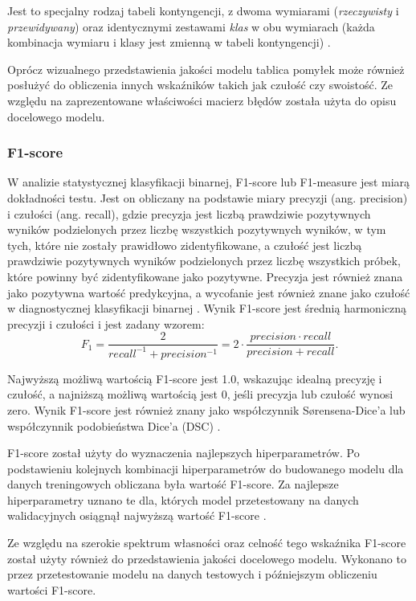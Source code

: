 \documentclass[polish, twoside, 12pt, a4paper]{article}
\theoremstyle{definition}
\theoremstyle{plain}
\theoremstyle{remark}
\begin{document}
Jest to specjalny rodzaj tabeli kontyngencji, z dwoma wymiarami (\emph{rzeczywisty} i \emph{przewidywany}) oraz identycznymi zestawami \emph{klas} w obu wymiarach (każda kombinacja wymiaru i klasy jest zmienną w tabeli kontyngencji) \citep{powers2011}.

Oprócz wizualnego przedstawienia jakości modelu tablica pomyłek może również posłużyć do obliczenia innych wskaźników takich jak czułość czy swoistość. Ze względu na zaprezentowane właściwości macierz błędów została użyta do opisu docelowego modelu.

\subsubsection{F1-score}

W analizie statystycznej klasyfikacji binarnej, F1-score lub F1-measure jest miarą dokładności testu. Jest on obliczany na podstawie miary precyzji (ang. precision) i czułości (ang. recall), gdzie precyzja jest liczbą prawdziwie pozytywnych wyników podzielonych przez liczbę wszystkich pozytywnych wyników, w tym tych, które nie zostały prawidłowo zidentyfikowane, a czułość jest liczbą prawdziwie pozytywnych wyników podzielonych przez liczbę wszystkich próbek, które powinny być zidentyfikowane jako pozytywne. Precyzja jest również znana jako pozytywna wartość predykcyjna, a wycofanie jest również znane jako czułość w diagnostycznej klasyfikacji binarnej \citep{powers2011}. Wynik F1-score jest średnią harmoniczną precyzji i czułości i jest zadany wzorem:
\[ 
  F_1 = \frac{2}{recall^{-1} + precision^{-1}} = 2 \cdot \frac{precision \cdot recall}{precision + recall}.
\]

Najwyższą możliwą wartością F1-score jest 1.0, wskazując idealną precyzję i czułość, a najniższą możliwą wartością jest 0, jeśli precyzja lub czułość wynosi zero. Wynik F1-score jest również znany jako współczynnik Sørensena-Dice'a lub współczynnik podobieństwa Dice'a (DSC) \citep{powers2011}.

F1-score został użyty do wyznaczenia najlepszych hiperparametrów. Po podstawieniu kolejnych kombinacji hiperparametrów do budowanego modelu dla danych treningowych obliczana była wartość F1-score. Za najlepsze hiperparametry uznano te dla, których model przetestowany na danych walidacyjnych osiągnął najwyższą wartość F1-score \citep{tharwat2018}.

Ze względu na szerokie spektrum własności oraz celność tego wskaźnika F1-score został użyty również do przedstawienia jakości docelowego modelu. Wykonano to przez przetestowanie modelu na danych testowych i późniejszym obliczeniu wartości F1-score.
\end{document}
